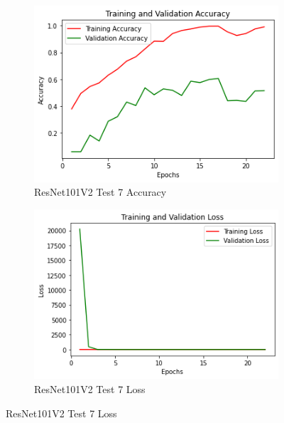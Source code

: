 \begin{figure}[H]
	\begin{subfigure}{0.5\textwidth}
		\includegraphics[width=0.9\linewidth]{img/resnet101v2/resnet101ftdeeperacc.png} 
		\caption{ResNet101V2 Test 7 Accuracy}
		\label{fig:resnet101ftdeeperacc}
	\end{subfigure}
	\begin{subfigure}{0.5\textwidth}
		\includegraphics[width=0.9\linewidth]{img/resnet101v2/resnet101ftdeeperloss.png}
		\caption{ResNet101V2 Test 7 Loss}
		\label{fig:resnet101ftdeeperloss}
	\end{subfigure}
\end{figure}

